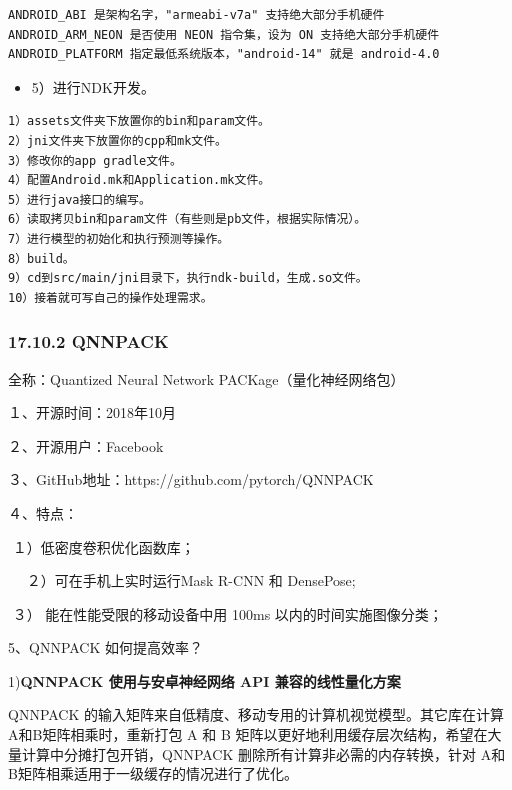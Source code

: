 \begin{verbatim}
ANDROID_ABI 是架构名字，"armeabi-v7a" 支持绝大部分手机硬件 
ANDROID_ARM_NEON 是否使用 NEON 指令集，设为 ON 支持绝大部分手机硬件 
ANDROID_PLATFORM 指定最低系统版本，"android-14" 就是 android-4.0
\end{verbatim}

\begin{itemize}
\item
  5）进行NDK开发。
\end{itemize}

\begin{verbatim}
1）assets文件夹下放置你的bin和param文件。
2）jni文件夹下放置你的cpp和mk文件。
3）修改你的app gradle文件。
4）配置Android.mk和Application.mk文件。
5）进行java接口的编写。
6）读取拷贝bin和param文件（有些则是pb文件，根据实际情况）。
7）进行模型的初始化和执行预测等操作。
8）build。
9）cd到src/main/jni目录下，执行ndk-build，生成.so文件。
10）接着就可写自己的操作处理需求。
\end{verbatim}

\subsubsection{17.10.2 QNNPACK}\label{qnnpack}

全称：Quantized Neural Network PACKage（量化神经网络包）　　　

１、开源时间：2018年10月　　　

２、开源用户：Facebook　　　　

３、GitHub地址：https://github.com/pytorch/QNNPACK　　　　

４、特点：　　　

​ １）低密度卷积优化函数库；　　　

　 ２）可在手机上实时运行Mask R-CNN 和 DensePose;

​ ３） 能在性能受限的移动设备中用 100ms 以内的时间实施图像分类；　　　

5、QNNPACK 如何提高效率？

1)\textbf{QNNPACK 使用与安卓神经网络 API 兼容的线性量化方案}

QNNPACK
的输入矩阵来自低精度、移动专用的计算机视觉模型。其它库在计算A和B矩阵相乘时，重新打包
A 和 B
矩阵以更好地利用缓存层次结构，希望在大量计算中分摊打包开销，QNNPACK
删除所有计算非必需的内存转换，针对
A和B矩阵相乘适用于一级缓存的情况进行了优化。

